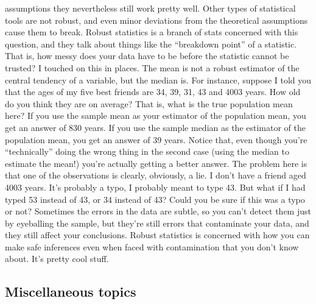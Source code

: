 \documentclass[
  a4paper,
]{book}
\begin{document}
\begin{itemize}
  assumptions they nevertheless still work pretty well. Other types of
  statistical tools are not robust, and even minor deviations from the
  theoretical assumptions cause them to break. Robust statistics is a
  branch of stats concerned with this question, and they talk about
  things like the ``breakdown point'' of a statistic. That is, how messy
  does your data have to be before the statistic cannot be trusted? I
  touched on this in places. The mean is not a robust estimator of the
  central tendency of a variable, but the median is. For instance,
  suppose I told you that the ages of my five best friends are 34, 39,
  31, 43 and 4003 years. How old do you think they are on average? That
  is, what is the true population mean here? If you use the sample mean
  as your estimator of the population mean, you get an answer of 830
  years. If you use the sample median as the estimator of the population
  mean, you get an answer of 39 years. Notice that, even though you're
  ``technically'' doing the wrong thing in the second case (using the
  median to estimate the mean!) you're actually getting a better answer.
  The problem here is that one of the observations is clearly,
  obviously, a lie. I don't have a friend aged 4003 years. It's probably
  a typo, I probably meant to type 43. But what if I had typed 53
  instead of 43, or 34 instead of 43? Could you be sure if this was a
  typo or not? Sometimes the errors in the data are subtle, so you can't
  detect them just by eyeballing the sample, but they're still errors
  that contaminate your data, and they still affect your conclusions.
  Robust statistics is concerned with how you can make safe inferences
  even when faced with contamination that you don't know about. It's
  pretty cool stuff.
\end{itemize}

\hypertarget{miscellaneous-topics}{%
\subsection*{Miscellaneous topics}\label{miscellaneous-topics}}
\end{document}
